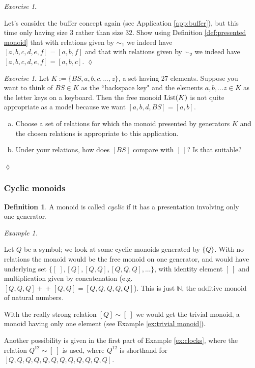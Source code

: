 \documentclass{book}
\def\tn{\textnormal}
\def\NN{{\mathbb N}}
\def\List{\tn{List}}
\def\plpl{+\!\!+\hspace{1pt}}
\theoremstyle{remark}
\newtheorem{example}[subsubsection]{Example}
\newtheorem{exc}[subsubsection]{Exercise}
\newenvironment{exercise}{\begin{exc}}{\hspace*{\fill}$\lozenge$\end{exc}}
\theoremstyle{definition}
\newtheorem{definition}[subsubsection]{Definition}
\def\sexc{\begin{enumerate}[a.)]\setlength{\itemsep}{.1cm}\setlength{\parskip}{.1cm}\item}
\def\next{\item}
\def\endsexc{\end{enumerate}}
\begin{document}
\begin{exercise}\label{exc:buffer3}

Let's consider the buffer concept again (see Application \ref{app:buffer}), but this time only having size 3 rather than size 32. Show using Definition \ref{def:presented monoid} that with relations given by $\sim_1$ we indeed have $[a,b,c,d,e,f]=[a,b,f]$ and that with relations given by $\sim_2$ we indeed have $[a,b,c,d,e,f]=[a,b,c]$.
\end{exercise}

\begin{exercise}
Let $K:=\{BS,a,b,c,\ldots,z\}$, a set having 27 elements. Suppose you want to think of $BS\in K$ as the ``backspace key" and the elements $a,b,\ldots z\in K$ as the letter keys on a keyboard. Then the free monoid $\List(K)$ is not quite appropriate as a model because we want $[a,b,d,BS]=[a,b]$. 
\sexc Choose a set of relations for which the monoid presented by generators $K$ and the chosen relations is appropriate to this application. 
\next Under your relations, how does $[BS]$ compare with $[\;]$? Is that suitable?
\endsexc
\end{exercise}


\subsubsection{Cyclic monoids}

\begin{definition}

A monoid is called {\em cyclic} if it has a presentation involving only one generator. 

\end{definition}

\begin{example}\label{ex:cyclic}

Let $Q$ be a symbol; we look at some cyclic monoids generated by $\{Q\}$. With no relations the monoid would be the free monoid on one generator, and would have underlying set $\{[\;],[Q],[Q,Q],[Q,Q,Q],\ldots\}$, with identity element $[\;]$ and multiplication given by concatenation (e.g. $[Q,Q,Q]\plpl[Q,Q]=[Q,Q,Q,Q,Q]$). This is just $\NN$, the additive monoid of natural numbers.

With the really strong relation $[Q]\sim[\;]$ we would get the trivial monoid, a monoid having only one element (see Example \ref{ex:trivial monoid}).

Another possibility is given in the first part of Example \ref{ex:clocks}, where the relation $Q^{12}\sim[\;]$ is used, where $Q^{12}$ is shorthand for $[Q,Q,Q,Q,Q,Q,Q,Q,Q,Q,Q,Q]$.

\end{example}
\end{document}
